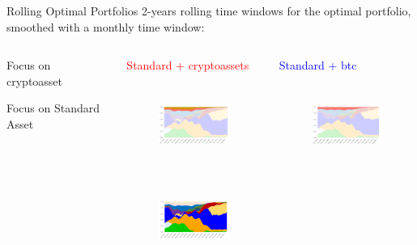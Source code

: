 \documentclass[c, 10pt]{beamer}
\newcommand\Fontvi{\fontsize{8}{7.2}\selectfont}
\newcommand\Fontci{\fontsize{7}{7.2}\selectfont}
\begin{document}
\begin{frame}{Rolling Optimal Portfolios}
2-years rolling time windows for the optimal portfolio, smoothed with a monthly time window:
	\begin{columns}
		\begin{column}{0.1\textwidth}
		    \bigskip
		    \bigskip
		    
            \Fontci{}Focus on cryptoasset
            \bigskip
            \bigskip
            \bigskip
            \bigskip
            \bigskip
            
            
            \Fontci{}Focus on Standard Asset
		\end{column}
		\begin{column}{0.3\textwidth}  
		    \begin{center}
            \Fontvi{}\textcolor{red}{Standard + cryptoassets}
            \end{center}
            \begin{figure}
                \centering
                \includegraphics[width=3.2cm, height=2.6cm]{Images/rolling_allocation/rollcrall.png}
            \end{figure}
            \begin{figure}
                \centering
                \includegraphics[width=3.2cm, height=2.6cm]{Images/rolling_allocation/rollstall.png}
            \end{figure}
		\end{column}
		\begin{column}{0.3\textwidth}  
		    \begin{center}
            \Fontvi{}\textcolor{blue}{Standard + btc}
            \end{center}
            \begin{figure}
                \centering
                \includegraphics[width=3.2cm, height=2.6cm]{Images/rolling_allocation/rollcrbtc.png}

\end{figure}
\end{column}
\end{columns}
\end{frame}
\end{document}
